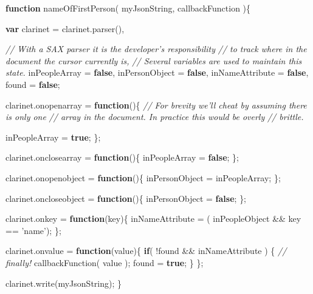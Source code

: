 \documentclass[]{article}
\newenvironment{Shaded}{}{}
\newcommand{\KeywordTok}[1]{\textcolor[rgb]{0.00,0.44,0.13}{\textbf{{#1}}}}
\newcommand{\StringTok}[1]{\textcolor[rgb]{0.25,0.44,0.63}{{#1}}}
\newcommand{\CommentTok}[1]{\textcolor[rgb]{0.38,0.63,0.69}{\textit{{#1}}}}
\newcommand{\OtherTok}[1]{\textcolor[rgb]{0.00,0.44,0.13}{{#1}}}
\newcommand{\FunctionTok}[1]{\textcolor[rgb]{0.02,0.16,0.49}{{#1}}}
\newcommand{\NormalTok}[1]{{#1}}
\begin{document}
\begin{Shaded}
\begin{Highlighting}[]
\KeywordTok{function} \FunctionTok{nameOfFirstPerson}\NormalTok{( myJsonString, callbackFunction )\{}


   \KeywordTok{var} \NormalTok{clarinet = }\OtherTok{clarinet}\NormalTok{.}\FunctionTok{parser}\NormalTok{(),}
   
       \CommentTok{// With a SAX parser it is the developer's responsibility }
       \CommentTok{// to track where in the document the cursor currently is,}
       \CommentTok{// Several variables are used to maintain this state.        }
       \NormalTok{inPeopleArray = }\KeywordTok{false}\NormalTok{,   }
       \NormalTok{inPersonObject = }\KeywordTok{false}\NormalTok{,}
       \NormalTok{inNameAttribute = }\KeywordTok{false}\NormalTok{,}
       \NormalTok{found = }\KeywordTok{false}\NormalTok{;}
   
   \OtherTok{clarinet}\NormalTok{.}\FunctionTok{onopenarray} \NormalTok{= }\KeywordTok{function}\NormalTok{()\{}
      \CommentTok{// For brevity we'll cheat by assuming there is only one}
      \CommentTok{// array in the document. In practice this would be overly}
      \CommentTok{// brittle.}
      
      \NormalTok{inPeopleArray = }\KeywordTok{true}\NormalTok{; }
   \NormalTok{\};}
   
   \OtherTok{clarinet}\NormalTok{.}\FunctionTok{onclosearray} \NormalTok{= }\KeywordTok{function}\NormalTok{()\{}
      \NormalTok{inPeopleArray = }\KeywordTok{false}\NormalTok{;}
   \NormalTok{\};   }
   
   \OtherTok{clarinet}\NormalTok{.}\FunctionTok{onopenobject} \NormalTok{= }\KeywordTok{function}\NormalTok{()\{}
      \NormalTok{inPersonObject = inPeopleArray; }
   \NormalTok{\};}
   
   \OtherTok{clarinet}\NormalTok{.}\FunctionTok{oncloseobject} \NormalTok{= }\KeywordTok{function}\NormalTok{()\{}
      \NormalTok{inPersonObject = }\KeywordTok{false}\NormalTok{;}
   \NormalTok{\};   }
      
   \OtherTok{clarinet}\NormalTok{.}\FunctionTok{onkey} \NormalTok{= }\KeywordTok{function}\NormalTok{(key)\{}
      \NormalTok{inNameAttribute = ( inPeopleObject && key == }\StringTok{'name'}\NormalTok{);}
   \NormalTok{\};}

   \OtherTok{clarinet}\NormalTok{.}\FunctionTok{onvalue} \NormalTok{= }\KeywordTok{function}\NormalTok{(value)\{}
      \KeywordTok{if}\NormalTok{( !found && inNameAttribute ) \{}
         \CommentTok{// finally!}
         \FunctionTok{callbackFunction}\NormalTok{( value );}
         \NormalTok{found = }\KeywordTok{true}\NormalTok{;}
      \NormalTok{\}}
   \NormalTok{\};      }
   
   \OtherTok{clarinet}\NormalTok{.}\FunctionTok{write}\NormalTok{(myJsonString);   }
\NormalTok{\}}
\end{Highlighting}
\end{Shaded}
\end{document}

